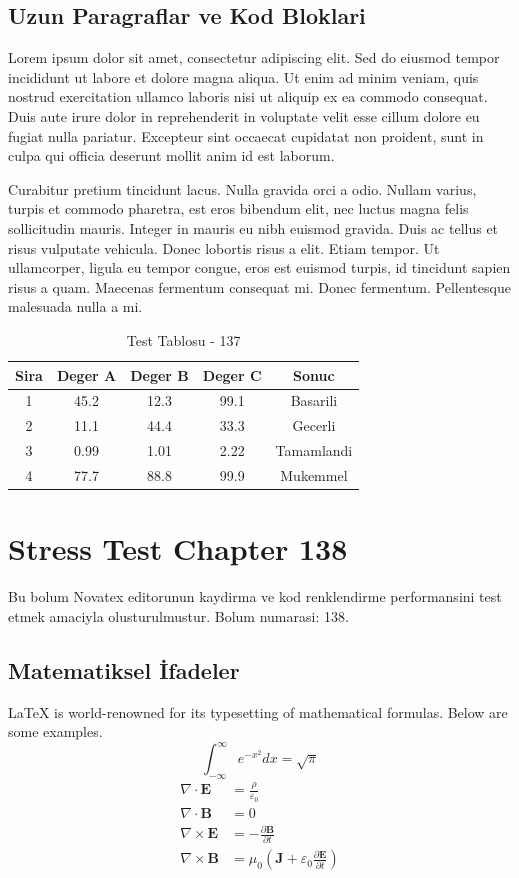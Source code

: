 \documentclass[12pt,a4paper]{article}
\begin{document}
\subsection{Uzun Paragraflar ve Kod Bloklari}
Lorem ipsum dolor sit amet, consectetur adipiscing elit. Sed do eiusmod tempor incididunt ut labore et dolore magna aliqua. Ut enim ad minim veniam, quis nostrud exercitation ullamco laboris nisi ut aliquip ex ea commodo consequat. Duis aute irure dolor in reprehenderit in voluptate velit esse cillum dolore eu fugiat nulla pariatur. Excepteur sint occaecat cupidatat non proident, sunt in culpa qui officia deserunt mollit anim id est laborum.

Curabitur pretium tincidunt lacus. Nulla gravida orci a odio. Nullam varius, turpis et commodo pharetra, est eros bibendum elit, nec luctus magna felis sollicitudin mauris. Integer in mauris eu nibh euismod gravida. Duis ac tellus et risus vulputate vehicula. Donec lobortis risus a elit. Etiam tempor. Ut ullamcorper, ligula eu tempor congue, eros est euismod turpis, id tincidunt sapien risus a quam. Maecenas fermentum consequat mi. Donec fermentum. Pellentesque malesuada nulla a mi.

\begin{table}[h!]
\centering
\begin{tabular}{|c|c|c|c|c|}
\hline
\textbf{Sira} & \textbf{Deger A} & \textbf{Deger B} & \textbf{Deger C} & \textbf{Sonuc} \\
\hline
1 & 45.2 & 12.3 & 99.1 & Basarili \\
2 & 11.1 & 44.4 & 33.3 & Gecerli \\
3 & 0.99 & 1.01 & 2.22 & Tamamlandi \\
4 & 77.7 & 88.8 & 99.9 & Mukemmel \\
\hline
\end{tabular}
\caption{Test Tablosu - 137}
\end{table}

\newpage
\section{Stress Test Chapter 138}
Bu bolum Novatex editorunun kaydirma ve kod renklendirme performansini test etmek amaciyla olusturulmustur. Bolum numarasi: 138.

\subsection{Matematiksel İfadeler}
\LaTeX{} is world-renowned for its typesetting of mathematical formulas. Below are some examples.
\begin{equation}
\int_{-\infty}^{\infty} e^{-x^2} dx = \sqrt{\pi}
\end{equation}
\begin{align}
\nabla \cdot \mathbf{E} &= \frac{\rho}{\varepsilon_0} \\
\nabla \cdot \mathbf{B} &= 0 \\
\nabla \times \mathbf{E} &= -\frac{\partial \mathbf{B}}{\partial t} \\
\nabla \times \mathbf{B} &= \mu_0\left(\mathbf{J} + \varepsilon_0 \frac{\partial \mathbf{E}}{\partial t}\right)
\end{align}
\end{document}
